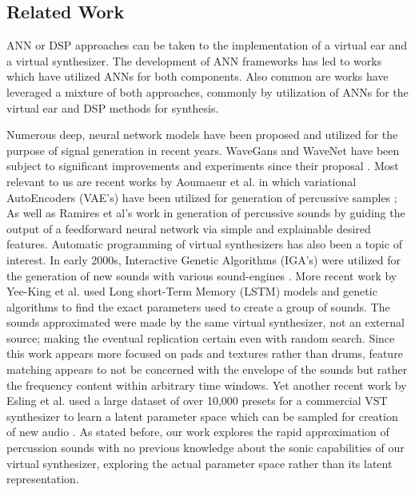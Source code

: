 \documentclass[\main/thesis.tex]{subfiles}
\begin{document}
\subsection{Related Work}
ANN or DSP approaches can be taken to the implementation of a virtual ear and a virtual synthesizer. The development of ANN frameworks has led to works which have utilized ANNs for both components. Also common are works have leveraged a mixture of both approaches, commonly by utilization of ANNs for the virtual ear and DSP methods for synthesis.

\begin{center}
\begin{table}[h*]
\caption{for reference, will delete} %
\end{table}
\end{center}
Numerous deep, neural network models have been proposed and utilized for the purpose of signal generation in recent years. WaveGans and WaveNet have been subject to significant improvements and experiments since their proposal \cite{nsynth2017,yamamoto2020parallel,oord2017parallel}. Most relevant to us are recent works by Aoumaeur et al. in which variational AutoEncoders (VAE's) have been utilized for generation of percussive samples \cite{aouameur2019neural}; As well as Ramires et al's work in generation of percussive sounds by guiding the output of a feedforward neural network via simple and explainable desired features. 
Automatic programming of virtual synthesizers has also been a topic of interest. In early 2000s, Interactive Genetic Algorithms (IGA's) were utilized for the generation of new sounds with various sound-engines \cite{johnson1999exploring,dahlstedt2001creating}. More recent work by Yee-King et al. \cite{yee2018automatic} used Long short-Term Memory (LSTM) models and genetic algorithms to find the exact parameters used to create a group of sounds. The sounds approximated were made by the same virtual synthesizer, not an external source; making the eventual replication certain even with random search. Since this work appears more focused on pads and textures rather than drums, feature matching appears to not be concerned with the envelope of the sounds but rather the frequency content within arbitrary time windows. Yet another recent work by Esling et al. used a large dataset of over 10,000 presets for a commercial VST synthesizer to learn a latent parameter space which can be sampled for creation of new audio \cite{esling2019universal}. As stated before, our work explores the rapid approximation of percussion sounds with no previous knowledge about the sonic capabilities of our virtual synthesizer, exploring the actual parameter space rather than its latent representation.

 
\end{document}
